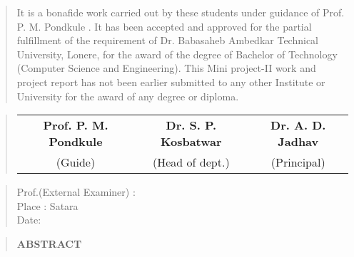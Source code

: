 \documentclass[12pt]{report}
\begin{document}
	\vspace{-0.9cm}
	\begin{quote}
		\normalsize
		It is a bonafide work carried out by these students under guidance of
		Prof. P. M. Pondkule  . It has been accepted and approved for the partial
		fulfillment of the requirement of Dr. Babasaheb Ambedkar Technical
		University, Lonere, for the award of the degree of Bachelor of
		Technology (Computer Science and Engineering). This Mini project-II work and project
		report has not been earlier submitted to any other Institute or University for the
		award of any degree or diploma.\\[8ex]
	\end{quote}
	
	\begin{quote}
		\normalsize
		\centering
		\vspace{3cm}
		\begin{table}[ht]
			\centering
			\begin{tabular}{c  c  c}
				\bfseries
				Prof. P. M. Pondkule \hspace{3ex}  & \bfseries Dr. S. P. Kosbatwar \hspace{3ex} & \bfseries Dr. A. D. Jadhav \\[2ex]
				(Guide) & (Head of dept.) & (Principal)\\[2ex]
			\end{tabular}
		\end{table}
	\end{quote}
	\vspace{2cm}
	\begin{quote}
		Prof.(External Examiner) :\\Place : Satara\\Date:
	\end{quote}
	\newpage
	
	
	\begin{quote}
		\centering
		\LARGE
		\textbf{ABSTRACT}
	\end{quote}
	
\end{document}
